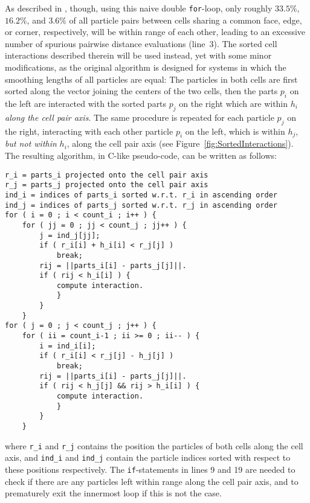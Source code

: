 \documentclass[final]{siamltex}
\newcommand{\fig}[1]
    {Figure~\ref{fig:#1}}
\begin{document}
As described in \cite{ref:Gonnet2007}, though, using this
naive double {\tt for}-loop, only roughly $33.5\%$, $16.2\%$,
and $3.6\%$ of all particle
pairs between cells sharing a common face, edge, or corner, respectively,
will be within range of each other, leading
to an excessive number of spurious pairwise distance evaluations (line~3).
The sorted cell interactions described therein will be used instead,
yet with some minor modifications, as
the original algorithm is designed for systems in which the
smoothing lengths of all particles are equal:
The particles in both cells are first sorted along the vector joining
the centers of the two cells, then the
parts $p_i$ on the left are interacted with the sorted parts $p_j$
on the right which are within $h_i$ {\em along the cell pair axis}.
The same procedure is repeated for each particle $p_j$ on the
right, interacting with each other particle $p_i$ on the
left, which is within $h_j$, {\em but not within} $h_i$, along
the cell pair axis (see \fig{SortedInteractions}).
The resulting algorithm, in C-like pseudo-code, can be written as follows:
        
\begin{center}\begin{minipage}{0.8\textwidth}
    \begin{lstlisting}
r_i = parts_i projected onto the cell pair axis
r_j = parts_j projected onto the cell pair axis
ind_i = indices of parts_i sorted w.r.t. r_i in ascending order
ind_j = indices of parts_j sorted w.r.t. r_j in ascending order
for ( i = 0 ; i < count_i ; i++ ) {
    for ( jj = 0 ; jj < count_j ; jj++ ) {
        j = ind_j[jj];
        if ( r_i[i] + h_i[i] < r_j[j] )
            break;
        rij = ||parts_i[i] - parts_j[j]||.
        if ( rij < h_i[i] ) {
            compute interaction.
            }
        }
    }
for ( j = 0 ; j < count_j ; j++ ) {
    for ( ii = count_i-1 ; ii >= 0 ; ii-- ) {
        i = ind_i[i];
        if ( r_i[i] < r_j[j] - h_j[j] )
            break;
        rij = ||parts_i[i] - parts_j[j]||.
        if ( rij < h_j[j] && rij > h_i[i] ) {
            compute interaction.
            }
        }
    }
    \end{lstlisting}
\end{minipage}\end{center}
        
\noindent where {\tt r\_i} and {\tt r\_j} contains the position
the particles of both cells along the cell axis, and
{\tt ind\_i} and {\tt ind\_j} contain the particle indices
sorted with respect to these positions respectively.
The {\tt if}-statements in lines 9 and 19 are needed to check
if there are any particles left within range along the cell
pair axis, and to prematurely exit the innermost loop if
this is not the case.
\end{document}
